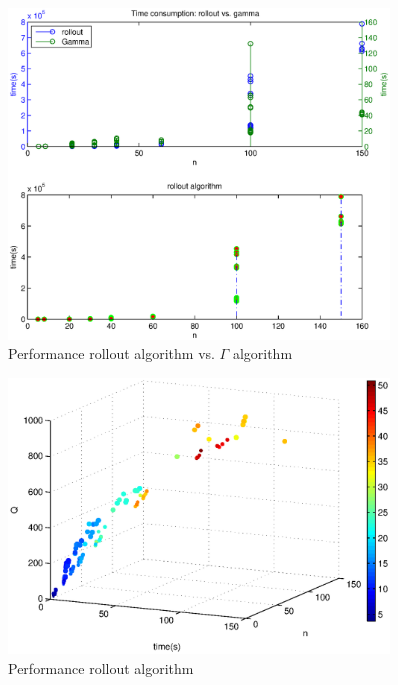 \begin{figure}[!htbp]
  \begin{center}
   \includegraphics[width=0.9\textwidth]{Images/Chapter5/ra_gamma_time_x2.eps}
  \end{center}
    \caption{Performance rollout algorithm vs. $\Gamma$ algorithm}\label{fig:ra_gamma_time_x2}
\end{figure}


\begin{figure}[!htbp]
  \begin{center}
   \includegraphics[width=0.9\textwidth]{Images/Chapter5/compare_expected_distance_ra.eps}
  \end{center}
    \caption{Performance rollout algorithm}\label{fig:compare_expected_distance_ra}
\end{figure}

